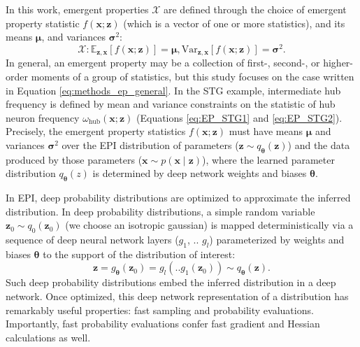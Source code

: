 \documentclass[11pt]{article}
\begin{document}
In this work, emergent properties $\mathcal{X}$ are defined through the choice of emergent property statistic $f(\mathbf{x}; \mathbf{z})$ (which is a vector of one or more statistics), and its means $\bm{\mu}$, and variances $\bm{\sigma}^2$:
 \begin{equation} \label{eq:methods_ep_general}
\mathcal{X}: \mathbb{E}_{\mathbf{z},\mathbf{x}}\left[f(\mathbf{x}; \mathbf{z})\right] = \bm{\mu}, \text{Var}_{\mathbf{z},\mathbf{x}}\left[f(\mathbf{x}; \mathbf{z})\right] = \bm{\sigma}^2.
\end{equation}
In general, an emergent property may be a collection of first-, second-, or higher-order moments of a group of statistics, but this study focuses on the case written in Equation \ref{eq:methods_ep_general}.
In the STG example, intermediate hub frequency is defined by mean and variance constraints on the statistic of hub neuron frequency $\omega_{\text{hub}}(\mathbf{x}; \mathbf{z})$ (Equations \ref{eq:EP_STG1} and \ref{eq:EP_STG2}).
Precisely, the emergent property statistics $f(\mathbf{x}; \mathbf{z})$ must have means $\bm{\mu}$ and variances $\bm{\sigma}^2$ over the EPI distribution of parameters ($\mathbf{z} \sim q_{\bm{\theta}}(\mathbf{z})$) and the data produced by those parameters ($\mathbf{x} \sim p(\mathbf{x} \mid \mathbf{z})$), where the learned parameter distribution $q_{\bm{\theta}}(z)$ is determined by deep network weights and biases $\bm{\theta}$.

In EPI, deep probability distributions are optimized to approximate the inferred distribution.
 In deep probability distributions, a simple random variable $\mathbf{z}_0 \sim q_0(\mathbf{z}_0)$ (we choose an isotropic gaussian) is mapped deterministically via a sequence of deep neural network layers ($g_1$, .. $g_l$) parameterized by weights and biases $\bm{\theta}$ to the support of the distribution of interest:
\begin{equation}
\label{eq:deep_transform}
\mathbf{z} = g_{\bm{\theta}}(\mathbf{z}_0) = g_l(..g_1(\mathbf{z}_0)) \sim q_{\bm{\theta}}(\mathbf{z}).
\end{equation}
Such deep probability distributions embed the inferred distribution in a deep network.
Once optimized, this deep network representation of a distribution has remarkably useful properties: fast sampling and probability evaluations.
Importantly, fast probability evaluations confer fast gradient and Hessian calculations as well.
\end{document}
